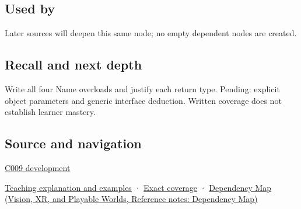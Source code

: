 \subsection{Used by}\label{appendix-d42039b1d6f7-used-by}

\hypertarget{appendix-d42039b1d6f7-used-by}{}

Later sources will deepen this same node; no empty dependent nodes are created.

\subsection{Recall and next depth}\label{appendix-d42039b1d6f7-recall-and-next-depth}

\hypertarget{appendix-d42039b1d6f7-recall-and-next-depth}{}

Write all four Name overloads and justify each return type. Pending: explicit object parameters and generic interface deduction. Written coverage does not establish learner mastery.

\subsection{Source and navigation}\label{appendix-d42039b1d6f7-source-and-navigation}

\hypertarget{appendix-d42039b1d6f7-source-and-navigation}{}

\hyperref[appendix-fd090d982a15-m009---parts-127-147]{C009 development}

\hyperref[01-foundations-i-ch003-an-accessor-must-respect-the-callers-lifetime]{Teaching explanation and examples} · \hyperref[appendix-fd090d982a15-m008---parts-113-126]{Exact coverage} · \href{../07-Vision-XR-and-Playable-Worlds/main.pdf\#nameddest=appendix-4ad47bdd269a}{Dependency Map (Vision, XR, and Playable Worlds, Reference notes: Dependency Map)}
